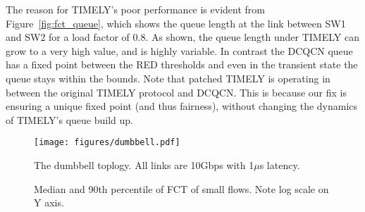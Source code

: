 The reason for TIMELY's poor performance is evident from
Figure~\ref{fig:fct_queue}, which shows the queue length at the link between
SW1 and SW2 for a load factor of 0.8. As shown, the queue length under TIMELY
can grow to a very high value, and is highly variable. In contrast the DCQCN queue has a
fixed point between the RED thresholds and even in the transient state
the queue stays within the bounds. Note that patched TIMELY is operating in between the original 
TIMELY protocol and DCQCN. This is because our fix is ensuring a
unique fixed point (and thus fairness), without 
changing the dynamics of TIMELY's queue build up. 


\begin{figure}[t]
\center
\texttt{[image: figures/dumbbell.pdf]}
\caption{The dumbbell toplogy. All links are 10Gbps with 1$\mu$s latency.}
\label{fig:fct_topo}
\end{figure}

\begin{figure}[t]
\center
{}
\caption{Median and 90th percentile of FCT of small flows. Note log scale on Y axis.}
\label{fig:fct_results}
\end{figure}
\fi



